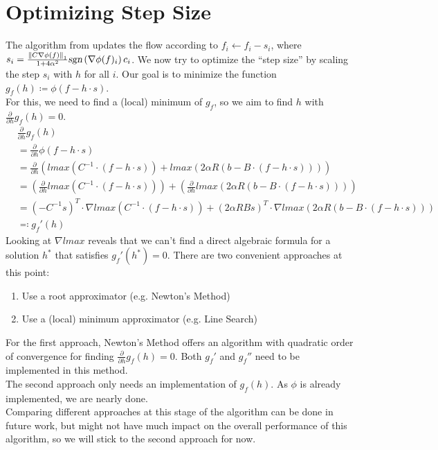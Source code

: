 \section{Optimizing Step Size}
\label{sec_oss}
The algorithm from \cite{nmfnlt} updates the flow according to $f_i\gets f_i-s_i$, where \\$s_i=\frac{\left\Vert C\nabla \phi(f)\right\Vert_1}{1+4\alpha^2}\textsl{sgn}\left(\nabla \phi(f)_i\right)c_i$. We now try to optimize the ``step size'' by scaling the step $s_i$ with $h$ for all $i$. Our goal is to minimize the function $g_f(h)\coloneqq\phi\left(f-h\cdot s\right)$.\\
For this, we need to find a (local) minimum of $g_f$, so we aim to find $h $ with $\frac{\partial}{\partial h}g_f(h)=0$.
\begin{align*}
&\frac{\partial}{\partial h}g_f(h)\\
&=\frac{\partial}{\partial h}\phi(f-h\cdot s)\\
&=\frac{\partial}{\partial h}\left(lmax\left(C^{-1}\cdot(f-h\cdot s)\right)+lmax\left(2\alpha R(b-B\cdot (f-h\cdot s))\right)\right)\\
&=\left(\frac{\partial}{\partial h}lmax\left(C^{-1}\cdot(f-h\cdot s)\right)\right)+\left(\frac{\partial}{\partial h}lmax\left(2\alpha R(b-B\cdot (f-h\cdot s))\right)\right)\\
&=\left(-C^{-1}s\right)^T\cdot \nabla lmax\left(C^{-1}\cdot(f-h\cdot s)\right)+\left(2\alpha RBs\right)^T\cdot \nabla lmax\left(2\alpha R(b-B\cdot (f-h\cdot s))\right)\\
&\eqqcolon g_f'(h)
\end{align*}
Looking at $\nabla lmax$ reveals that we can't find a direct algebraic formula for a solution $h^*$ that satisfies $g_f'(h^*)=0$. There are two convenient approaches at this point:
\begin{enumerate}
\item Use a root approximator (e.g. Newton's Method)
\item Use a (local) minimum approximator (e.g. Line Search)
\end{enumerate}
For the first approach, Newton's Method offers an algorithm with quadratic order of convergence for finding $\frac{\partial}{\partial h}g_f(h)=0$. Both $g_f'$ and $g_f''$ need to be implemented in this method.\\
The second approach only needs an implementation of $g_f(h)$. As $\phi$ is already implemented, we are nearly done.\\
Comparing different approaches at this stage of the algorithm can be done in future work, but might not have much impact on the overall performance of this algorithm, so we will stick to the second approach for now.\\

